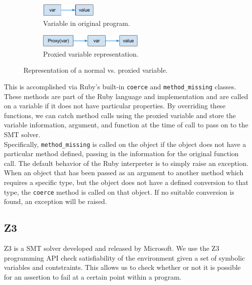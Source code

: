 \documentclass[10pt]{article}
\begin{document}
\begin{figure}
  \centering
  \begin{subfigure}{0.5\textwidth}
	\centering
	\includegraphics[height=25px]{pointer1.png}
	\caption{Variable in original program.}
	\label{pointer:1}
  \end{subfigure}\begin{subfigure}{0.5\textwidth}
	\centering
	\includegraphics[height=25px]{pointer2.png}
	\caption{Proxied variable representation.}
	\label{pointer:2}
  \end{subfigure}
  \caption{Representation of a normal vs. proxied variable.}
\end{figure}

This is accomplished via Ruby's built-in \texttt{coerce} and \texttt{method\_missing} classes.  These methods are part of the Ruby language and implementation and are called on a variable if it does not have particular properties.  By overriding these functions, we can catch method calls using the proxied variable and store the variable information, argument, and function at the time of call to pass on to the SMT solver.\\

Specifically, \texttt{method\_missing} is called on the object if the object does not have a particular method defined, passing in the information for the original function call.  The default behavior of the Ruby interpreter is to simply raise an exception.\\

When an object that has been passed as an argument to another method which requires a specific type, but the object does not have a defined conversion to that type, the \texttt{coerce} method is called on that object.  If no suitable conversion is found, an exception will be raised.\\

\subsection{Z3}
Z3 is a SMT solver developed and released by Microsoft.  We use the Z3 programming API check satisfiability of the environment given a set of symbolic variables and contstraints.  This allows us to check whether or not it is possible for an assertion to fail at a certain point within a program.
\end{document}
